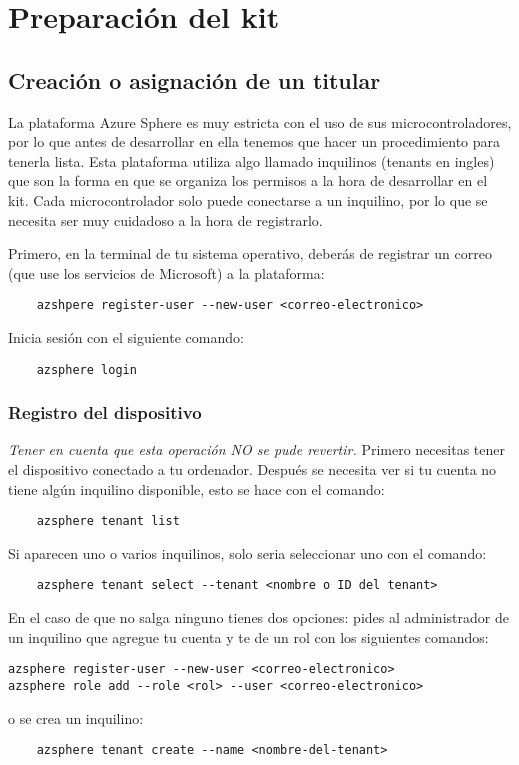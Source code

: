 \section{Preparación del kit}
\subsection{Creación o asignación de un titular}
La plataforma Azure Sphere es muy estricta con el uso de sus microcontroladores, por lo que antes de desarrollar en ella tenemos que hacer un procedimiento para tenerla lista. Esta plataforma utiliza algo llamado inquilinos (tenants en ingles) que son la forma en que se organiza los permisos a la hora de desarrollar en el kit. Cada microcontrolador solo puede conectarse a un inquilino, por lo que se necesita ser muy cuidadoso a la hora de registrarlo.

Primero, en la terminal de tu sistema operativo, deberás de registrar un correo (que use los servicios de Microsoft) a la plataforma: 
\begin{verbatim}
	azshpere register-user --new-user <correo-electronico>
\end{verbatim}

Inicia sesión con el siguiente comando:
\begin{verbatim}
	azsphere login
\end{verbatim}

\subsubsection{Registro del dispositivo}
\textit{Tener en cuenta que esta operación NO se pude revertir.}
\linebreak
\linebreak
Primero necesitas tener el dispositivo conectado a tu ordenador. Después se necesita ver si tu cuenta no tiene algún inquilino disponible, esto se hace con el comando:
\begin{verbatim}
	azsphere tenant list
\end{verbatim}
Si aparecen uno o varios inquilinos, solo seria seleccionar uno con el comando:
\begin{verbatim}
	azsphere tenant select --tenant <nombre o ID del tenant>
\end{verbatim}

En el caso de que no salga ninguno tienes dos opciones: pides al administrador de un inquilino que agregue tu cuenta y te de un rol con los siguientes comandos:
\begin{verbatim}
azsphere register-user --new-user <correo-electronico>
azsphere role add --role <rol> --user <correo-electronico>
\end{verbatim}
o se crea un inquilino:
\begin{verbatim}
	azsphere tenant create --name <nombre-del-tenant>
\end{verbatim}


